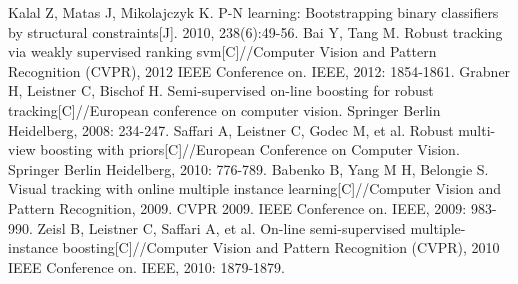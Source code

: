 \begin{thebibliography}{148}
Kalal Z, Matas J, Mikolajczyk K. P-N learning: Bootstrapping binary classifiers by structural constraints[J]. 2010, 238(6):49-56.
Bai Y, Tang M. Robust tracking via weakly supervised ranking svm[C]//Computer Vision and Pattern Recognition (CVPR), 2012 IEEE Conference on. IEEE, 2012: 1854-1861.
Grabner H, Leistner C, Bischof H. Semi-supervised on-line boosting for robust tracking[C]//European conference on computer vision. Springer Berlin Heidelberg, 2008: 234-247.
Saffari A, Leistner C, Godec M, et al. Robust multi-view boosting with priors[C]//European Conference on Computer Vision. Springer Berlin Heidelberg, 2010: 776-789.
Babenko B, Yang M H, Belongie S. Visual tracking with online multiple instance learning[C]//Computer Vision and Pattern Recognition, 2009. CVPR 2009. IEEE Conference on. IEEE, 2009: 983-990.
Zeisl B, Leistner C, Saffari A, et al. On-line semi-supervised multiple-instance boosting[C]//Computer Vision and Pattern Recognition (CVPR), 2010 IEEE Conference on. IEEE, 2010: 1879-1879.
\end{thebibliography}
